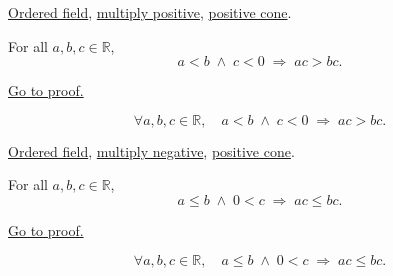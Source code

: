 \begin{dependencies}
\hyperref[def:real-ordered-field]{Ordered field},
\hyperref[thm:ordered-field-positive-multiplication-preserves-order]{multiply positive},
\hyperref[def:positive-cone]{positive cone}.
\end{dependencies}


\begin{theorem}
\label{thm:ineq-multiply-negative}
For all $a, b, c \in \mathbb{R}$,
\[
  a < b \;\land\; c < 0 \;\Rightarrow\; ac > bc.
\]
\end{theorem}



\begin{remark*}[Proof]
\hyperref[prf:ineq-multiply-negative]{Go to proof.}
\end{remark*}

\begin{remark*}
\[
  \forall a, b, c \in \mathbb{R},\quad
  a < b \;\land\; c < 0 \;\Rightarrow\; ac > bc.
\]
\end{remark*}

\begin{dependencies}
\hyperref[def:real-ordered-field]{Ordered field},
\hyperref[thm:ordered-field-negative-multiplication-reverses-order]{multiply negative},
\hyperref[def:positive-cone]{positive cone}.
\end{dependencies}


\begin{theorem}
\label{thm:ineq-nonstrict-multiply-positive}
For all $a, b, c \in \mathbb{R}$,
\[
  a \le b \;\land\; 0 < c \;\Rightarrow\; ac \le bc.
\]
\end{theorem}



\begin{remark*}[Proof]
\hyperref[prf:ineq-nonstrict-multiply-positive]{Go to proof.}
\end{remark*}

\begin{remark*}
\[
  \forall a, b, c \in \mathbb{R},\quad
  a \le b \;\land\; 0 < c \;\Rightarrow\; ac \le bc.
\]
\end{remark*}

